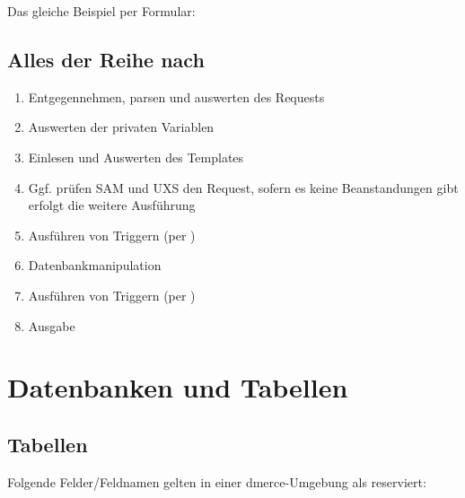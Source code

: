 \medskip

Das gleiche Beispiel per Formular:


\section{Alles der Reihe nach}

\begin{enumerate}
\item Entgegennehmen, parsen und auswerten des Requests
\item Auswerten der privaten Variablen
\item Einlesen und Auswerten des Templates
\item Ggf. pr\"ufen SAM und UXS den Request, sofern es keine
  Beanstandungen gibt erfolgt die weitere Ausf\"uhrung
\item Ausf\"uhren von Triggern (per )
\item Datenbankmanipulation
\item Ausf\"uhren von Triggern (per )
\item Ausgabe
\end{enumerate}

\chapter{Datenbanken und Tabellen}

\section{Tabellen}

Folgende Felder/Feldnamen gelten in einer dmerce-Umgebung als
reserviert:

\medskip

